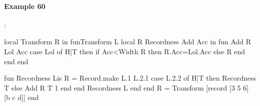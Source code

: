 \documentclass[11pt,a4paper,twoside,openright]{report}
\begin{document}
%
%
%
%
%
%
%


\paragraph{Example 60}:

\begin{OZ}
local Transform R in 
	fun{Transform L}
		local R Recordness Add Acc
		in 
		    fun {Add R Lol Acc}
        			case Lol of H|T then
		            if Acc<{Width R} then R.Acc=Lol.Acc
         		   else R
            			end 
        			end 
    			end 
    
    		fun {Recordness Lis}
        		R = {Record.make L.1 L.2.1}
        		case L.2.2 of H|T then {Recordness T}
           	 else {Add R T 1}
            	end 
        	end 
    		{Recordness L}
	end    
	end
R = {Transform [record [3 5 6] [b c d]]}
end
\end{OZ}
\end{document}
